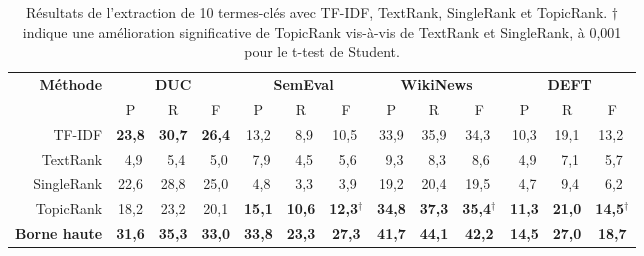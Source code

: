     \begin{table}
      \centering
      \begin{tabular}{@{~}r@{~~}c@{~~}c@{~~}c@{~~}c@{~~}c@{~~}c@{~~}c@{~~}c@{~~}c@{~~}c@{~~}c@{~~}c@{~}}
        \toprule
        \multirow{2}{*}[-2pt]{\textbf{Méthode}} & \multicolumn{3}{c}{\textbf{DUC}} & \multicolumn{3}{c}{\textbf{SemEval}} & \multicolumn{3}{c}{\textbf{WikiNews}} & \multicolumn{3}{c}{\textbf{DEFT}}\\
        \cmidrule(r){2-4}\cmidrule(r){5-7}\cmidrule(r){8-10}\cmidrule{11-13}
        & P & R & F & P & R & F & P & R & F & P & R & F\\
        \midrule
        TF-IDF & \textbf{23,8} & \textbf{30,7} & \textbf{26,4} & 13,2 & $~~$8,9 & 10,5$^{~}$ & 33,9 & 35,9 & 34,3$^{~}$ & 10,3 & 19,1 & 13,2$^{~}$\\
        TextRank & $~~$4,9 & $~~$5,4 & $~~$5,0 & $~~$7,9 & $~~$4,5 & $~~$5,6$^{~}$ & $~~$9,3 & $~~$8,3 & $~~$8,6$^{~}$ & $~~$4,9 & $~~$7,1 & $~~$5,7$^{~}$\\
        SingleRank & 22,6 & 28,8 & 25,0 & $~~$4,8 & $~~$3,3 & $~~$3,9$^{~}$ & 19,2 & 20,4 & 19,5$^{~}$ & $~~$4,7 & $~~$9,4 & $~~$6,2$^{~}$\\
        TopicRank & 18,2 & 23,2 & 20,1 & \textbf{15,1} & \textbf{10,6} & \textbf{12,3}$^\dagger$ & \textbf{34,8} & \textbf{37,3} & \textbf{35,4}$^\dagger$ & \textbf{11,3} & \textbf{21,0} & \textbf{14,5}$^\dagger$\\
        \midrule
        \textbf{Borne haute} & \textbf{31,6} & \textbf{35,3} & \textbf{33,0} & \textbf{33,8} & \textbf{23,3} & \textbf{27,3} & \textbf{41,7} & \textbf{44,1} & \textbf{42,2} & \textbf{14,5} & \textbf{27,0} & \textbf{18,7}\\
        \bottomrule
      \end{tabular}
      \caption{Résultats de l'extraction de 10 termes-clés avec TF-IDF,
               TextRank, SingleRank et TopicRank. $\dagger$ indique une
               amélioration significative de TopicRank vis-à-vis de TextRank et
               SingleRank, à 0,001 pour le t-test de Student.
               \label{tab:resultats_globaux}}
    \end{table}

